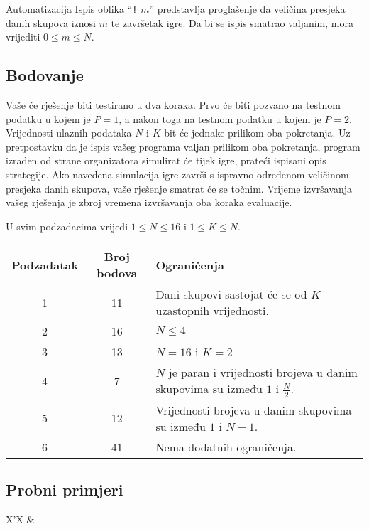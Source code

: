 \begin{statement}[
  problempoints=100,
  timelimit=1 sekunda,
  memorylimit=512 MiB,
]{Automatizacija}
Ispis oblika “\texttt{!} $m$” predstavlja proglašenje da veličina presjeka danih skupova 
iznosi $m$ te završetak igre. 
Da bi se ispis smatrao valjanim, mora vrijediti $0 \leq m \leq N$. 

\subsection*{Bodovanje}

Vaše će rješenje biti testirano u dva koraka. 
Prvo će biti pozvano na testnom podatku u kojem je $P = 1$, a nakon toga 
na testnom podatku u kojem je $P = 2$. 
Vrijednosti ulaznih podataka $N$ i $K$ bit će jednake prilikom oba pokretanja. 
Uz pretpostavku da je ispis vašeg programa valjan prilikom oba pokretanja, 
program izrađen od strane organizatora simulirat će tijek igre, prateći 
ispisani opis strategije. 
Ako navedena simulacija igre završi 
s ispravno određenom veličinom presjeka danih skupova, vaše rješenje 
smatrat će se točnim.
Vrijeme izvršavanja vašeg rješenja je zbroj vremena izvršavanja oba koraka evaluacije. 

U svim podzadacima vrijedi $1 \leq N \leq 16$ i $1 \leq K \leq N$.

{\renewcommand{\arraystretch}{1.4}
  \setlength{\tabcolsep}{6pt}
  \begin{tabular}{ccl}
   Podzadatak & Broj bodova & Ograničenja \\ \midrule
    1 & 11 & Dani skupovi sastojat će se od $K$ uzastopnih vrijednosti. \\
    2 & 16 & $N \leq 4$ \\
    3 & 13 & $N = 16$ i $K = 2$ \\
    4 & 7 & $N$ je paran i vrijednosti brojeva u danim skupovima su između $1$ i $\frac{N}{2}$. \\
    5 & 12 & Vrijednosti brojeva u danim skupovima su između $1$ i $N - 1$. \\
    6 & 41 & Nema dodatnih ograničenja.
\end{tabular}}

\subsection*{Probni primjeri}
\begin{tabularx}{\textwidth}{X'X}
 &
\end{tabularx}


\end{statement}

